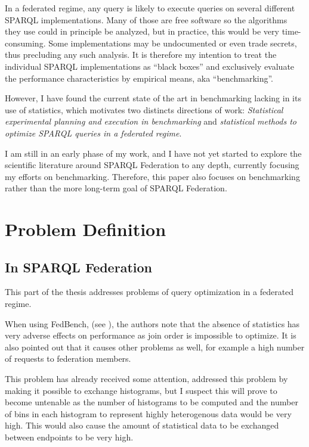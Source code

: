 \documentclass{llncs}
\begin{document}
In a federated regime, any query is likely to execute queries on
several different SPARQL implementations. Many of those are free
software so the algorithms they use could in principle be analyzed,
but in practice, this would be very time-consuming. Some
implementations may be undocumented or even trade secrets, thus
precluding any such analysis. It is therefore my intention to treat
the individual SPARQL implementations as ``black boxes'' and
exclusively evaluate the performance characteristics by empirical
means, aka ``benchmarking''.

However, I have found the current state of the art in benchmarking
lacking in its use of statistics, which motivates two distincts
directions of work: \emph{Statistical experimental planning and execution in
benchmarking} and \emph{statistical methods to optimize SPARQL queries
in a federated regime}.

I am still in an early phase of my work, and I have not yet started to
explore the scientific literature around SPARQL Federation to any
depth, currently focusing my efforts on benchmarking. Therefore, this
paper also focuses on benchmarking rather than the more long-term goal
of SPARQL Federation.

\section{Problem Definition}

\subsection{In SPARQL Federation}

This part of the thesis addresses problems of query optimization in a
federated regime.

When using FedBench, (see \cite{Schmidt:2011:FBS:2063016.2063054}),
the authors note that the absence of statistics has very adverse
effects on performance as join order is impossible to optimize. It is
also pointed out that it causes other problems as well, for example a
high number of requests to federation members. 

This problem has already received some attention, \cite{5337556}
addressed this problem by making it possible to exchange histograms,
but I suspect this will prove to become untenable as the number of
histograms to be computed and the number of bins in each histogram to
represent highly heterogenous data would be very high. This would also
cause the amount of statistical data to be exchanged between endpoints
to be very high.
\end{document}
